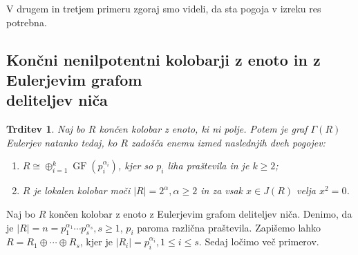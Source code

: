 \documentclass[a4paper, 12pt]{amsart}
\theoremstyle{definition} %
\theoremstyle{plain} %
\newtheorem{trditev}[definicija]{Trditev}
\DeclareMathOperator{\GF}{GF}
\begin{document}
V drugem in tretjem primeru zgoraj smo videli, da sta pogoja v izreku res potrebna.


\subsection{Končni nenilpotentni kolobarji z enoto in z Eulerjevim grafom \\deliteljev niča}

\begin{trditev}
\label{EulerEnotski}
Naj bo $R$ končen kolobar z enoto, ki ni polje. Potem je graf $\Gamma(R)$ Eulerjev natanko tedaj, ko $R$ zadošča enemu izmed naslednjih dveh pogojev:
\begin{enumerate}
\item $R \cong \oplus_{i=1}^k \GF(p_i^{\alpha_i})$, kjer so $p_i$ liha praštevila in je $k\ge 2$;
\item $R$ je lokalen kolobar moči $|R| = 2^{\alpha}, \alpha \ge 2$ in za vsak $x\in J(R)$ velja $x^2 = 0$.
\end{enumerate}
\end{trditev}

\proof
Naj bo $R$ končen kolobar z enoto z Eulerjevim grafom deliteljev niča. Denimo, da je $|R| = n = p_1^{\alpha_1}\cdots p_s^{\alpha_s}, s\ge 1$, $p_i$ paroma različna praštevila. Zapišemo lahko $R=R_1\oplus \cdots \oplus R_s$, kjer je $|R_i| = p_i^{\alpha_i}, 1 \le i \le s$. Sedaj ločimo več primerov.
\end{document}
